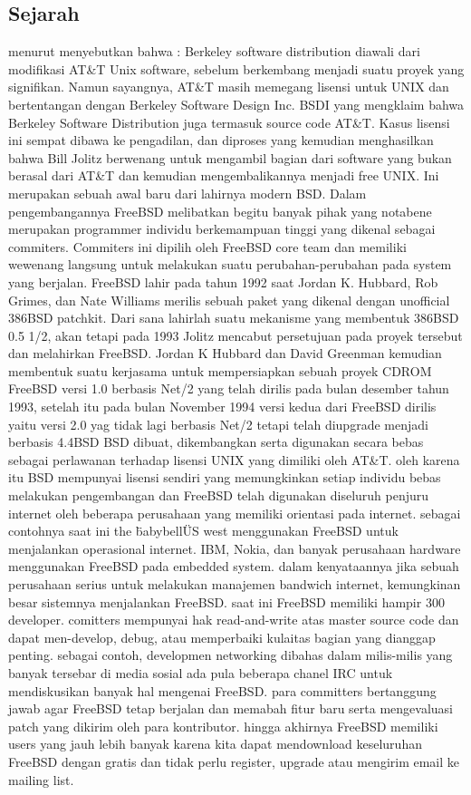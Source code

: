 \subsection{Sejarah}
	menurut \cite{luanmembangun} menyebutkan bahwa :
	Berkeley software distribution diawali dari modifikasi AT\&T Unix software, sebelum berkembang menjadi suatu proyek yang signifikan. Namun sayangnya, AT\&T masih memegang lisensi untuk UNIX dan bertentangan dengan Berkeley Software Design Inc. BSDI yang mengklaim bahwa Berkeley Software Distribution juga termasuk source code AT&T.
	Kasus lisensi ini sempat dibawa ke pengadilan, dan diproses yang kemudian  menghasilkan bahwa Bill Jolitz berwenang untuk mengambil bagian dari software yang bukan berasal dari AT\&T dan kemudian mengembalikannya menjadi free UNIX. Ini merupakan sebuah awal baru dari lahirnya modern BSD.
	Dalam pengembangannya FreeBSD melibatkan begitu banyak pihak yang notabene merupakan programmer individu berkemampuan tinggi yang dikenal sebagai commiters. Commiters ini dipilih oleh FreeBSD core team dan memiliki wewenang langsung untuk melakukan suatu perubahan-perubahan pada system yang  berjalan.
	FreeBSD lahir pada tahun 1992 saat Jordan K. Hubbard, Rob Grimes, dan Nate Williams merilis sebuah paket yang dikenal dengan unofficial 386BSD patchkit. Dari sana lahirlah suatu mekanisme yang membentuk 386BSD 0.5 1/2, akan tetapi pada 1993 Jolitz mencabut persetujuan pada proyek tersebut dan melahirkan FreeBSD. 
	Jordan K Hubbard dan David Greenman kemudian membentuk suatu kerjasama untuk mempersiapkan sebuah proyek CDROM FreeBSD versi 1.0 berbasis Net/2 yang telah dirilis pada bulan desember tahun 1993, setelah itu pada bulan November 1994 versi kedua dari FreeBSD dirilis yaitu versi 2.0 yag tidak lagi 
	berbasis Net/2 tetapi telah diupgrade menjadi berbasis 4.4BSD BSD dibuat, dikembangkan serta digunakan secara bebas sebagai perlawanan terhadap lisensi UNIX yang dimiliki oleh AT\&T. oleh karena itu BSD mempunyai lisensi sendiri yang memungkinkan setiap individu bebas melakukan pengembangan dan
	FreeBSD telah digunakan diseluruh penjuru internet oleh beberapa perusahaan yang memiliki orientasi pada internet. sebagai contohnya saat ini the \"babybell\" US west menggunakan FreeBSD untuk menjalankan operasional internet. IBM, Nokia, dan banyak perusahaan hardware menggunakan FreeBSD pada embedded system.
	dalam kenyataannya jika sebuah perusahaan serius untuk melakukan manajemen bandwich internet, kemungkinan besar sistemnya menjalankan FreeBSD.
	saat ini FreeBSD memiliki hampir 300 developer. comitters mempunyai hak read-and-write atas master source code dan dapat men-develop, debug, atau memperbaiki kulaitas bagian yang dianggap penting.
	sebagai contoh, developmen networking dibahas dalam milis-milis yang banyak tersebar di media sosial ada pula beberapa chanel IRC untuk mendiskusikan banyak hal mengenai FreeBSD.
	para committers bertanggung jawab agar FreeBSD tetap berjalan dan memabah fitur baru serta mengevaluasi patch yang dikirim oleh para kontributor. 
	hingga akhirnya FreeBSD memiliki users yang jauh lebih banyak karena kita dapat mendownload keseluruhan FreeBSD dengan gratis dan tidak perlu register, upgrade atau mengirim email ke mailing list.

